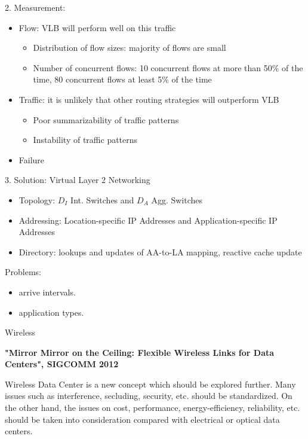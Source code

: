 \documentclass[journal,onecolumn,11pt]{IEEEtran}
\begin{document}
2. Measurement:
\begin{itemize}
  \item Flow: VLB will perform well on this traffic
  \begin{itemize}
    \item Distribution of flow sizes: majority of flows are small
    \item Number of concurrent flows: 10 concurrent flows at more than 50\% of the time, 80 concurrent flows at least 5\% of the time
  \end{itemize}
  \item Traffic: it is unlikely that other routing strategies will outperform VLB
  \begin{itemize}
    \item Poor summarizability of traffic patterns
    \item Instability of traffic patterns
  \end{itemize}
  \item Failure
\end{itemize}

3. Solution: Virtual Layer 2 Networking
\begin{itemize}
  \item Topology: $D_I$ Int. Switches and $D_A$ Agg. Switches
  \item Addressing: Location-specific IP Addresses and Application-specific IP Addresses
  \item Directory: lookups and updates of AA-to-LA mapping, reactive cache update
\end{itemize}

Problems:
\begin{itemize}
  \item arrive intervals.
  \item application types.
\end{itemize}

Wireless

\textbf{"Mirror Mirror on the Ceiling: Flexible Wireless Links for Data Centers", SIGCOMM 2012}

Wireless Data Center is a new concept which should be explored further. Many issues such as interference, secluding, security, etc. should be standardized. On the other hand, the issues on cost, performance, energy-efficiency, reliability, etc. should be taken into consideration compared with electrical or optical data centers.

\end{document}
